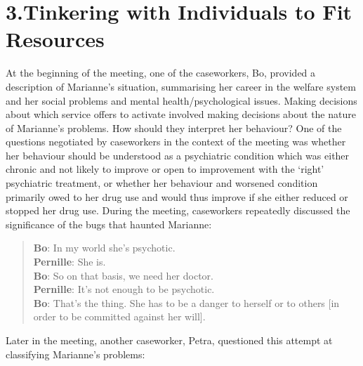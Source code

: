 \section{3.\hspace*{1em}Tinkering with Individuals to Fit Resources}
At the beginning of the meeting, one of the caseworkers, Bo, provided a description of Marianne’s situation, summarising her career in the welfare system and her social problems and mental health/psychological issues. Making decisions about which service offers to activate involved making decisions about the nature of Marianne’s problems. How should they interpret her behaviour? One of the questions negotiated by caseworkers in the context of the meeting was whether her behaviour should be understood as a psychiatric condition which was either chronic and not likely to improve or open to improvement with the ‘right’ psychiatric treatment, or whether her behaviour and worsened condition primarily owed to her drug use and would thus improve if she either reduced or stopped her drug use. During the meeting, caseworkers repeatedly discussed the significance of the bugs that haunted Marianne:
    \blockquote{\textnormal{\bfseries Bo}:        In my world she’s psychotic.
    \\\textnormal{\bfseries Pernille}: 	She is.
    \\\textnormal{\bfseries Bo}: 		So on that basis, we need her doctor.
    \\\textnormal{\bfseries Pernille}: 	It’s not enough to be psychotic.
    \\\textnormal{\bfseries Bo}:		That’s the thing. She has to be a danger to herself or to others [in order to be committed against her will].}
\noindent Later in the meeting, another caseworker, Petra, questioned this attempt at classifying Marianne’s problems:
